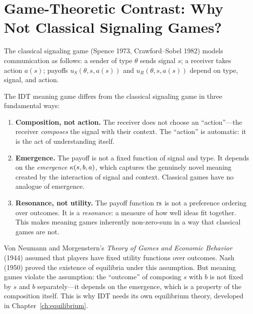 \section{Game-Theoretic Contrast: Why Not Classical Signaling Games?}

The classical signaling game (Spence 1973, Crawford--Sobel 1982) models
communication as follows: a sender of type $\theta$ sends signal $s$; a
receiver takes action $a(s)$; payoffs $u_S(\theta, s, a(s))$ and
$u_R(\theta, s, a(s))$ depend on type, signal, and action.

\begin{remark}
The IDT meaning game differs from the classical signaling game in three
fundamental ways:
\begin{enumerate}
\item \textbf{Composition, not action.} The receiver does not choose an
``action''---the receiver \emph{composes} the signal with their context. The
``action'' is automatic: it is the act of understanding itself.
\item \textbf{Emergence.} The payoff is not a fixed function of signal and
type. It depends on the \emph{emergence} $\kappa(s, b, a)$, which captures
the genuinely novel meaning created by the interaction of signal and context.
Classical games have no analogue of emergence.
\item \textbf{Resonance, not utility.} The payoff function $\mathrm{rs}$ is not a
preference ordering over outcomes. It is a \emph{resonance}: a measure of
how well ideas fit together. This makes meaning games inherently
non-zero-sum in a way that classical games are not.
\end{enumerate}
\end{remark}

Von Neumann and Morgenstern's \emph{Theory of Games and Economic Behavior}
(1944) assumed that players have fixed utility functions over outcomes. Nash
(1950) proved the existence of equilibria under this assumption. But meaning
games violate the assumption: the ``outcome'' of composing $s$ with $b$ is
not fixed by $s$ and $b$ separately---it depends on the emergence, which is
a property of the composition itself. This is why IDT needs its own
equilibrium theory, developed in Chapter~\ref{ch:equilibrium}.

